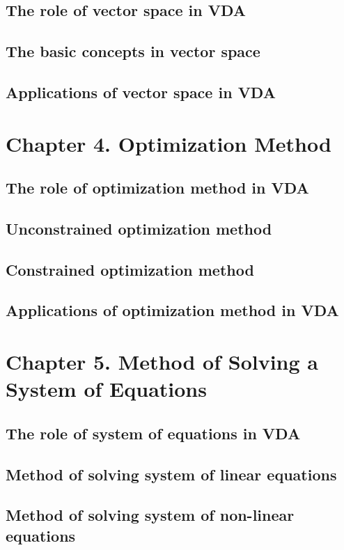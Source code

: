 \subsection{The role of vector space in VDA}
\subsection{The basic concepts in vector space}
\subsection{Applications of vector space in VDA}

\section{Chapter 4. Optimization Method}
\subsection{The role of optimization method in VDA}
\subsection{Unconstrained optimization method}
\subsection{Constrained optimization method}
\subsection{Applications of optimization method in VDA}

\section{Chapter 5. Method of Solving a System of Equations}
\subsection{The role of system of equations in VDA}
\subsection{Method of solving system of linear equations}
\subsection{Method of solving system of non-linear equations}
